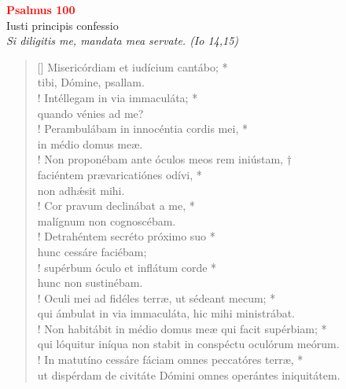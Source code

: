 


\def\greinitialformat#1{%
{\fontsize{39}{39}\selectfont #1}%
}




\vspace{0.3cm}
\begin{center}
 \textcolor{red}{\large \bf Psalmus 100}\\
Iusti principis confessio\\
\textit{\small Si diligitis me, mandata mea servate. (Io 14,15)}
\end{center}
\begin{verse}[\versewidth]
Misericórdiam et iudícium cantábo; *\\
tibi, Dómine, psallam.\\!
\vin Intéllegam in via immaculáta; *\\
\vin quando vénies ad me?\\!
Perambulábam in innocéntia cordis mei, *\\
in médio domus meæ.\\!
\vin Non proponébam ante óculos meos rem iniústam, †\\
\vin faciéntem prævaricatiónes odívi, *\\
\vin non adh\'{æ}sit mihi.\\!
Cor pravum declinábat a me, *\\
malígnum non cognoscébam.\\!
\vin Detrahéntem secréto próximo suo *\\
\vin hunc cessáre faciébam;\\!
supérbum óculo et inflátum corde *\\
hunc non sustinébam.\\!
\vin Oculi mei ad fidéles terræ, ut sédeant mecum; *\\
\vin qui ámbulat in via immaculáta, hic mihi ministrábat.\\!
Non habitábit in médio domus meæ qui facit supérbiam; *\\
qui lóquitur iníqua non stabit in conspéctu oculórum meórum.\\!
\vin In matutíno cessáre fáciam omnes peccatóres terræ, *\\
\vin ut dispérdam de civitáte Dómini omnes operántes iniquitátem.\\
\end{verse}
\vspace{1cm}


